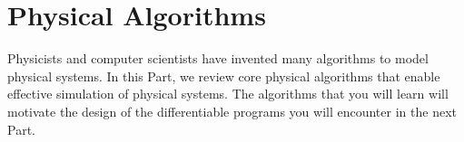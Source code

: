 \documentclass[book.tex]{subfiles}
\begin{document}
\pagestyle{empty}
\vspace*{36 pt}
\part{Physical Algorithms}
\label{part:physical_algorithms}

Physicists and computer scientists have invented many algorithms to model physical systems. In this Part, we review core physical algorithms that enable effective simulation of physical systems. The algorithms that you will learn will motivate the design of the differentiable programs you will encounter in the next Part.
%

%
%
%

%
\end{document}
